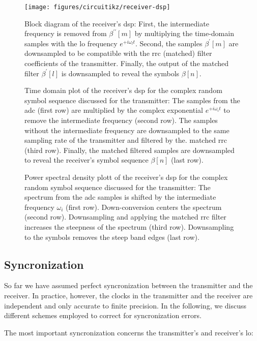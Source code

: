 \begin{figure}[htb]
	\centering
	\texttt{[image: figures/circuitikz/receiver-dsp]}
	\caption{Block diagram of the receiver's \gls{dsp}: First, the intermediate frequency is removed from $\beta^{\prime\prime}[m]$ by multiplying the time-domain samples with the \gls{lo} frequency $e^{+i\omega_lt}$. Second, the samples $\beta^\prime[m]$ are downsampled to be compatible with the \gls{rrc} (matched) filter coefficients of the transmitter. Finally, the output of the matched filter $\beta^\prime[l]$ is downsampled to reveal the symbols $\beta[n]$.}
\end{figure}

\begin{figure}[htb]
	\centering
	
	\caption{Time domain plot of the receiver's \gls{dsp} for the complex random symbol sequence discussed for the transmitter: The samples from the \gls{adc} (first row) are multiplied by the complex exponential $e^{+i\omega_it}$ to remove the intermediate frequency (second row). The samples without the intermediate frequency are downsampled to the same sampling rate of the transmitter and filtered by the. matched \gls{rrc} (third row). Finally, the matched filtered samples are downsampled to reveal the receiver's symbol sequence $\beta[n]$ (last row).}
\end{figure}

\begin{figure}[htb]
	\centering
	
	\caption{Power spectral density plott of the receiver's \gls{dsp} for the complex random symbol sequence discussed for the transmitter: The spectrum from the \gls{adc} samples is shifted by the intermediate frequency $\omega_i$ (first row). Down-conversion centers the spectrum (second row). Downsampling and applying the matched \gls{rrc} filter increases the steepness of the spectrum (third row). Downsampling to the symbols removes the steep band edges (last row).}
\end{figure}

\FloatBarrier
\subsection{Syncronization}


So far we have assumed perfect syncronization between the transmitter and the receiver.
In practice, however, the clocks in the transmitter and the receiver are independent and only accurate to finite precision.
In the following, we discuss different schemes employed to correct for syncronization errors.

The most important syncronization concerns the transmitter's and receiver's \gls{lo}: